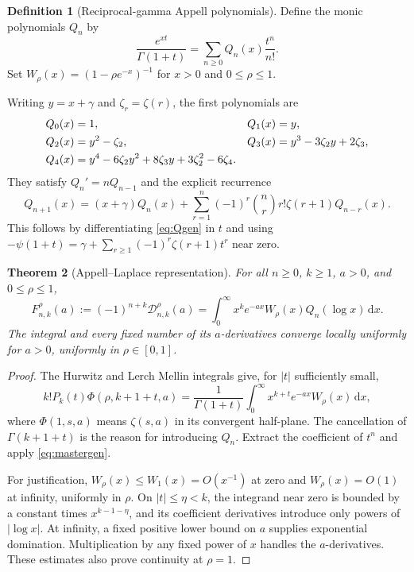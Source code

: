 \documentclass[11pt]{article}
\newtheorem{theorem}{Theorem}[section]
\theoremstyle{definition}
\newtheorem{definition}[theorem]{Definition}
\theoremstyle{remark}
\newcommand{\dd}{\,\mathrm d}
\newcommand{\D}{\mathcal D}
\begin{document}
\begin{definition}[Reciprocal-gamma Appell polynomials]\label{def:Q}
Define the monic polynomials $Q_n$ by
\begin{equation}\label{eq:Qgen}
 \frac{e^{xt}}{\Gamma(1+t)}=\sum_{n\geq0}Q_n(x)\frac{t^n}{n!}.
\end{equation}
Set $W_\rho(x)=(1-\rho e^{-x})^{-1}$ for $x>0$ and $0\leq\rho\leq1$.
\end{definition}

Writing $y=x+\gamma$ and $\zeta_r=\zeta(r)$, the first polynomials are
\begin{align}
 Q_0(x)&=1,& Q_1(x)&=y,\notag\\
 Q_2(x)&=y^2-\zeta_2,& Q_3(x)&=y^3-3\zeta_2y+2\zeta_3,\label{eq:Qsmall}\\
 Q_4(x)&=y^4-6\zeta_2y^2+8\zeta_3y+3\zeta_2^2-6\zeta_4.\notag
\end{align}
They satisfy $Q_n'=nQ_{n-1}$ and the explicit recurrence
\begin{equation}\label{eq:Qrec}
 Q_{n+1}(x)=(x+\gamma)Q_n(x)
       +\sum_{r=1}^n(-1)^r\binom nr r!\zeta(r+1)Q_{n-r}(x).
\end{equation}
This follows by differentiating \eqref{eq:Qgen} in $t$ and using
$-\psi(1+t)=\gamma+\sum_{r\geq1}(-1)^r\zeta(r+1)t^r$ near zero.

\begin{theorem}[Appell--Laplace representation]\label{thm:laplace}
For all $n\geq0$, $k\geq1$, $a>0$, and $0\leq\rho\leq1$,
\begin{equation}\label{eq:laplace}
 F_{n,k}^{\rho}(a):=(-1)^{n+k}\D_{n,k}^{\rho}(a)
   =\int_0^\infty x^k e^{-ax}W_\rho(x)Q_n(\log x)\dd x.
\end{equation}
The integral and every fixed number of its $a$-derivatives converge locally uniformly for $a>0$, uniformly in $\rho\in[0,1]$.
\end{theorem}
\begin{proof}
The Hurwitz and Lerch Mellin integrals give, for $|t|$ sufficiently small,
\[
 k!P_k(t)\Phi(\rho,k+1+t,a)
   =\frac1{\Gamma(1+t)}\int_0^\infty x^{k+t}e^{-ax}W_\rho(x)\dd x,
\]
where $\Phi(1,s,a)$ means $\zeta(s,a)$ in its convergent half-plane. The cancellation of $\Gamma(k+1+t)$ is the reason for introducing $Q_n$. Extract the coefficient of $t^n$ and apply \eqref{eq:mastergen}.

For justification, $W_\rho(x)\leq W_1(x)=O(x^{-1})$ at zero and $W_\rho(x)=O(1)$ at infinity, uniformly in $\rho$. On $|t|\leq\eta<k$, the integrand near zero is bounded by a constant times $x^{k-1-\eta}$, and its coefficient derivatives introduce only powers of $|\log x|$. At infinity, a fixed positive lower bound on $a$ supplies exponential domination. Multiplication by any fixed power of $x$ handles the $a$-derivatives. These estimates also prove continuity at $\rho=1$.
\end{proof}
\end{document}
